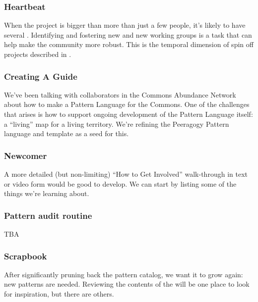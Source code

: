 \subsubsection*{Heartbeat} When the project is bigger than more than just a few people, it's likely to have several .  Identifying and fostering new  and new working groups is a task that can help make the community more robust.  This is the temporal dimension of spin off projects described in .

\subsubsection*{Creating A Guide} We’ve been talking with collaborators in the Commons Abundance Network
about how to make a Pattern Language for the Commons. One of the
challenges that arises is how to support ongoing development of the
Pattern Language itself: a “living” map for a living territory. We’re
refining the Peeragogy Pattern language and template as a seed for this.

\subsubsection*{Newcomer} A more detailed (but non-limiting) ``How to Get Involved'' walk-through in text or video form would be good to develop. We can start by listing some of the things we're learning about.

\subsubsection*{Pattern audit routine}  TBA

\subsubsection*{Scrapbook} After significantly pruning back the pattern catalog, we want it to grow again: new patterns are needed.  Reviewing the contents of the  will be one place to look for inspiration, but there are others.




